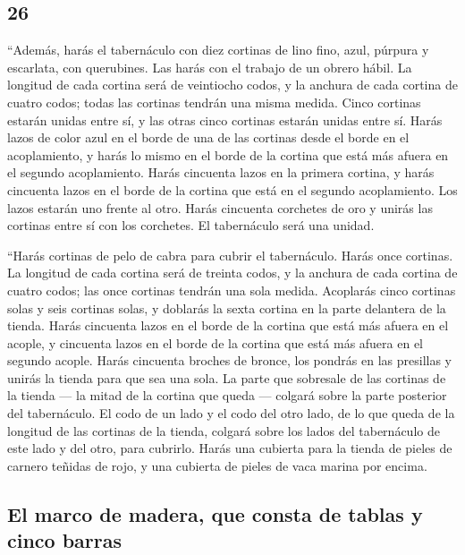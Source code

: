 \begin{paracol}{2}
\hypertarget{section-50}{%
\section{26}\label{section-50}}

 ``Además, harás el tabernáculo con diez cortinas de lino
fino, azul, púrpura y escarlata, con querubines. Las harás con el
trabajo de un obrero hábil.  La longitud de cada cortina
será de veintiocho codos, y la anchura de cada cortina de cuatro codos;
todas las cortinas tendrán una misma medida.  Cinco
cortinas estarán unidas entre sí, y las otras cinco cortinas estarán
unidas entre sí.  Harás lazos de color azul en el borde de
una de las cortinas desde el borde en el acoplamiento, y harás lo mismo
en el borde de la cortina que está más afuera en el segundo
acoplamiento.  Harás cincuenta lazos en la primera
cortina, y harás cincuenta lazos en el borde de la cortina que está en
el segundo acoplamiento. Los lazos estarán uno frente al otro.
 Harás cincuenta corchetes de oro y unirás las cortinas
entre sí con los corchetes. El tabernáculo será una unidad.

 ``Harás cortinas de pelo de cabra para cubrir el
tabernáculo. Harás once cortinas.  La longitud de cada
cortina será de treinta codos, y la anchura de cada cortina de cuatro
codos; las once cortinas tendrán una sola medida. 
Acoplarás cinco cortinas solas y seis cortinas solas, y doblarás la
sexta cortina en la parte delantera de la tienda.  Harás
cincuenta lazos en el borde de la cortina que está más afuera en el
acople, y cincuenta lazos en el borde de la cortina que está más afuera
en el segundo acople.  Harás cincuenta broches de bronce,
los pondrás en las presillas y unirás la tienda para que sea una sola.
 La parte que sobresale de las cortinas de la tienda ---
la mitad de la cortina que queda --- colgará sobre la parte posterior
del tabernáculo.  El codo de un lado y el codo del otro
lado, de lo que queda de la longitud de las cortinas de la tienda,
colgará sobre los lados del tabernáculo de este lado y del otro, para
cubrirlo.  Harás una cubierta para la tienda de pieles de
carnero teñidas de rojo, y una cubierta de pieles de vaca marina por
encima.

\hypertarget{el-marco-de-madera-que-consta-de-tablas-y-cinco-barras}{%
\subsection{El marco de madera, que consta de tablas y cinco
barras}\label{el-marco-de-madera-que-consta-de-tablas-y-cinco-barras}}


\end{paracol}
